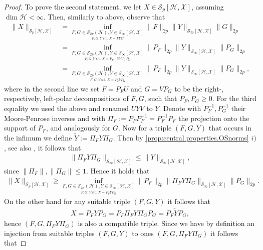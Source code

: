 \documentclass[11pt]{article}
\newcommand{\1}{\ensuremath{\mathbbm{1}}}
\theoremstyle{newdefinition}
\theoremstyle{newplain}
\theoremstyle{myplain}
\begin{document}
\begin{proof}
\noindent To prove the second statement, we let $X\in\mathcal{S}_{p}[\mathcal{H},\mathcal{X}]$, assuming $\dim\mathcal{H}<\infty$. Then, similarly to above, observe that
\begin{align}
\|X\|_{\mathcal{S}_p[\mathcal{H},\mathcal{X}]} &= \inf_{\underset{F,G,Y  \text{ s.t. } X=FYG}{F,G\in \mathcal{S}_{2p}(\mathcal{H}), Y\in \mathcal{S}_\infty[\mathcal{H},\mathcal{X}]}}\|F\|_{2p}\|Y\|_{\mathcal{S}_\infty[\mathcal{H},\mathcal{X}]}\|G\|_{2p} \\     
&= \inf_{\underset{F,G,Y  \text{ s.t. }X=P_F(UYV)P_G}{F,G\in \mathcal{S}_{2p}(\mathcal{H}), Y\in \mathcal{S}_\infty[\mathcal{H},\mathcal{X}]}}\|P_F\|_{2p}\|Y\|_{\mathcal{S}_\infty[\mathcal{H},\mathcal{X}]}\|P_G\|_{2p} \\ 
&= \inf_{\underset{F,G,Y  \text{ s.t. }X=P_FYP_G}{F,G\in \mathcal{S}_{2p}(\mathcal{H}), Y\in \mathcal{S}_\infty[\mathcal{H},\mathcal{X}]}}\|P_F\|_{2p}\|Y\|_{\mathcal{S}_\infty[\mathcal{H},\mathcal{X}]}\|P_G\|_{2p},
\end{align} where in the second line we set $F=P_FU$ and $G=VP_G$ to be the right-, respectively, left-polar decompositions of $F,G$, such that $P_F,P_G\geq 0$. For the third equality we used the above and renamed $UYV$ to $Y$. Denote with $P_F^{-1},P_G^{-1}$ their Moore-Penrose inverses and with $\Pi_F:=P_FP_F^{-1}=P_F^{-1}P_F$ the projection onto the support of $P_F$, and analogously for $G$. 
Now for a triple $(F,G,Y)$ that occurs in the infimum we define $\tilde{Y}:=\Pi_FY\Pi_G$. Then by \cref{prop:central.properties.OSnorms} $i)$, see also \cite[Lemma 1.6]{Book.Pisier.1998}, it follows that
\begin{align}
\|\Pi_FY\Pi_G\|_{\mathcal{S}_\infty[\mathcal{H},\mathcal{X}]} \leq \|Y\|_{\mathcal{S}_\infty[\mathcal{H},\mathcal{X}]},
\end{align} since $\|\Pi_F\|,\|\Pi_G\|\leq 1$.
Hence it holds that
\begin{align}
    \|X\|_{\mathcal{S}_p[\mathcal{H},\mathcal{X}]} \geq
    \inf_{\underset{F,G,Y  \text{ s.t. }X=P_FYP_G}{F,G\in \mathcal{S}_{2p}(\mathcal{H}), Y\in \mathcal{S}_\infty[\mathcal{H},\mathcal{X}]}}\|P_F\|_{2p}\|\Pi_FY\Pi_G\|_{\mathcal{S}_\infty[\mathcal{H},\mathcal{X}]}\|P_G\|_{2p}.
\end{align}
On the other hand for any suitable triple $(F,G,Y)$ it follows that
\begin{align}
    X=P_FYP_G=P_F\Pi_FY\Pi_GP_G=P_F\tilde{Y}P_G,
\end{align} hence $(F,G,\Pi_FY\Pi_G)$ is also a compatible triple. Since we have by definition an injection from suitable triples $(F,G,Y)$ to ones $(F,G,\Pi_FY\Pi_G)$ it follows that

\end{proof}
\end{document}
